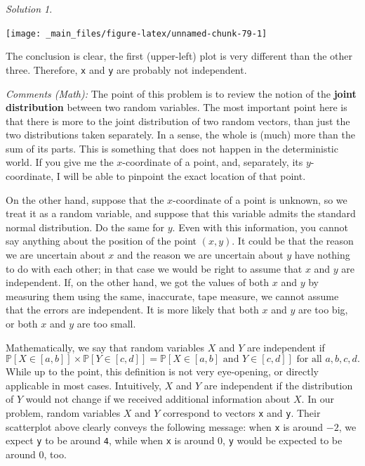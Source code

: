 \documentclass[
]{book}
\theoremstyle{definition}
\theoremstyle{definition}
\theoremstyle{definition}
\theoremstyle{definition}
\theoremstyle{remark}
\newtheorem*{solution}{Solution}
\begin{document}
\begin{solution}
\begin{center}\texttt{[image: \_main\_files/figure-latex/unnamed-chunk-79-1]} \end{center}

The conclusion is clear, the first (upper-left) plot is very different than the
other three. Therefore, \texttt{x} and \texttt{y} are probably not independent.

\emph{Comments (Math):} The point of this problem is to review the notion of the \textbf{joint
distribution} between two random variables. The most important point here is
that there is more to the joint distribution of two random vectors, than just
the two distributions taken separately. In a sense, the whole is (much) more
than the sum of its parts. This is something that does not happen in the
deterministic world. If you give me the \(x\)-coordinate of a point, and,
separately, its \(y\)-coordinate, I will be able to pinpoint the exact location of
that point.

On the other hand, suppose that the \(x\)-coordinate of a point is unknown, so we
treat it as a random variable, and suppose that this variable admits the
standard normal distribution. Do the same for \(y\). Even with this information,
you cannot say anything about the position of the point \((x,y)\). It could be
that the reason we are uncertain about \(x\) and the reason we are uncertain about
\(y\) have nothing to do with each other; in that case we would be right to assume
that \(x\) and \(y\) are independent. If, on the other hand, we got the values of
both \(x\) and \(y\) by measuring them using the same, inaccurate, tape measure, we
cannot assume that the errors are independent. It is more likely that both \(x\)
and \(y\) are too big, or both \(x\) and \(y\) are too small.

Mathematically, we say that random variables \(X\) and \(Y\) are independent if
\[{\mathbb{P}}[X \in [a,b]] \times {\mathbb{P}}[ Y \in [c,d] ] = {\mathbb{P}}[ X\in [a,b] \text{ and } Y\in [c,d]]\text{ for all } a,b,c,d.\]
While up to the point,
this definition is not very eye-opening, or directly applicable in most cases.
Intuitively, \(X\) and \(Y\) are independent if the distribution of \(Y\) would not
change if we received additional information about \(X\). In our problem, random
variables \(X\) and \(Y\) correspond to vectors \texttt{x} and \texttt{y}. Their scatterplot above
clearly conveys the following message: when \texttt{x} is around \(-2\), we expect \texttt{y} to
be around \texttt{4}, while when \texttt{x} is around \(0\), \texttt{y} would be expected to be around
\(0\), too.


\end{solution}
\end{document}
